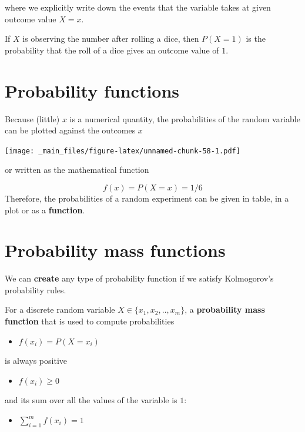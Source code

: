 \documentclass[
]{book}
\providecommand{\tightlist}{%
  \setlength{\itemsep}{0pt}\setlength{\parskip}{0pt}}
\begin{document}
where we explicitly write down the events that the variable takes at given outcome value \(X=x\).

If \(X\) is observing the number after rolling a dice, then \(P(X=1)\) is the probability that the roll of a dice gives an outcome value of \(1\).

\hypertarget{probability-functions}{%
\section{Probability functions}\label{probability-functions}}

Because (little) \(x\) is a numerical quantity, the probabilities of the random variable can be plotted against the outcomes \(x\)

\texttt{[image: \_main\_files/figure-latex/unnamed-chunk-58-1.pdf]}

or written as the mathematical function

\[f(x)=P(X=x)=1/6\]
Therefore, the probabilities of a random experiment can be given in table, in a plot or as a \textbf{function}.

\hypertarget{probability-mass-functions}{%
\section{Probability mass functions}\label{probability-mass-functions}}

We can \textbf{create} any type of probability function if we satisfy Kolmogorov's probability rules.

For a discrete random variable \(X \in \{x_1 , x_2 , .. , x_m\}\), a \textbf{probability mass function} that is used to compute probabilities

\begin{itemize}
\tightlist
\item
  \(f(x_i)=P(X=x_i)\)
\end{itemize}

is always positive

\begin{itemize}
\tightlist
\item
  \(f(x_i)\geq 0\)
\end{itemize}

and its sum over all the values of the variable is \(1\):

\begin{itemize}
\tightlist
\item
  \(\sum_{i=1}^m f(x_i)=1\)
\end{itemize}
\end{document}
